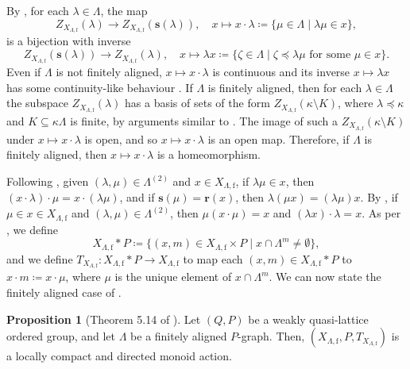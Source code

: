 \documentclass[11pt]{amsart}
\theoremstyle{definition}
\numberwithin{thm}{section}
\numberwithin{equation}{section}
\newtheorem{proposition}[thm]{Proposition}
\newcommand{\setof}[2]{\{ #1 \mid #2 \}}
\newcommand{\range}{\mathbf{r}}
\newcommand{\source}{\mathbf{s}}
\newcommand{\PSfiltershiftoff}[2]{#2 \cdot #1}
\newcommand{\PSfiltershifton}[2]{#1 #2}
\newcommand{\F}{\mathrm{f}}
\newcommand{\PS}[2]{X_{#2, #1}}
\newcommand{\RPA}[2]{#1 \cdot #2}
\newcommand{\composablepairs}[1]{#1^{(2)}}
\newcommand{\Fell}[3]{Z_{#1}\left(#2 \setminus #3\right)}
\newcommand{\Fellin}[2]{Z_{#1}\left(#2\right)}
\begin{document}
By \cite[Lemma 3.4]{BSV13}, for each $\lambda \in \Lambda$, the map
\[
\Fellin{\PS{\F}{\Lambda}}{\lambda} 
\to \Fellin{\PS{\F}{\Lambda}}{\source(\lambda)},
\quad 
x 
\mapsto \PSfiltershiftoff{\lambda}{x} 
\coloneqq \setof{\mu \in \Lambda}{\lambda\mu \in x},
\]
is a bijection with inverse 
\[
\Fellin{\PS{\F}{\Lambda}}{\source(\lambda)} 
\to \Fellin{\PS{\F}{\Lambda}}{\lambda},
\quad 
x 
\mapsto \PSfiltershifton{\lambda}{x} 
\coloneqq \setof{
\zeta \in \Lambda
}{
\zeta \preceq \lambda\mu \text{ for some } \mu \in x
}.
\]
Even if $\Lambda$ is not finitely aligned, $x \mapsto 
\PSfiltershiftoff{\lambda}{x}$ is continuous \cite[Lemma 5.3]{Jon26} 
and its inverse $x \mapsto \PSfiltershifton{\lambda}{x}$ has some 
continuity-like behaviour \cite[Lemma 5.13]{Jon26}.
If $\Lambda$ is finitely aligned, then for each $\lambda \in \Lambda$ the 
subspace $\Fellin{\PS{\F}{\Lambda}}{\lambda}$ has a basis of sets of the form 
$\Fell{\PS{\F}{\Lambda}}{\kappa}{K}$, where $\lambda \preceq \kappa$ and $K 
\subseteq \kappa\Lambda$ is finite, by arguments similar to 
\cite[Lemma 6.2]{Jon26}. 
The image of such a $\Fell{\PS{\F}{\Lambda}}{\kappa}{K}$ under $x \mapsto 
\PSfiltershiftoff{\lambda}{x}$ is open, and so $x \mapsto 
\PSfiltershiftoff{\lambda}{x}$ is an open map.
Therefore, if $\Lambda$ is finitely aligned, then $x \mapsto 
\PSfiltershiftoff{\lambda}{x}$ is a homeomorphism.

Following \cite[Lemma 5.1]{Jon26}, given $(\lambda, \mu) \in 
\composablepairs{\Lambda}$ and $x \in \PS{\F}{\Lambda}$, if $\lambda\mu \in 
x$, then $\PSfiltershiftoff{\mu}{(\PSfiltershiftoff{\lambda}{x})} = 
\PSfiltershiftoff{(\lambda\mu)}{x}$, and if $\source(\mu) = \range(x)$, then 
$\PSfiltershifton{\lambda}{(\PSfiltershifton{\mu}{x})} = 
\PSfiltershifton{(\lambda\mu)}{x}$.
By \cite[Lemma 3.4]{BSV13}, if $\mu \in x \in \PS{\F}{\Lambda}$ and 
$(\lambda, \mu) \in \composablepairs{\Lambda}$, then 
$\PSfiltershifton{\mu}{(\PSfiltershiftoff{\mu}{x})} = x$ and 
$\PSfiltershiftoff{\lambda}{(\PSfiltershifton{\lambda}{x})} = x$.
As per \cite[Definition 5.8]{Jon26}, we define
\[
\PS{\F}{\Lambda} * P \coloneqq 
\setof{
(x, m) \in \PS{\F}{\Lambda} \times P
}{
x \cap \Lambda^m \neq \emptyset
},
\]
and we define $T_{\PS{\F}{\Lambda}} \colon \PS{\F}{\Lambda} * P \to \PS{\F}{\Lambda}$ to map each $(x, m) \in \PS{\F}{\Lambda} * P$ to $\RPA{x}{m} \coloneqq \PSfiltershiftoff{\mu}{x}$, where $\mu$ is the unique element of $x \cap \Lambda^m$.
We can now state the finitely aligned case of \cite[Theorem 5.14]{Jon26}.

\begin{proposition}[Theorem 5.14 of \cite{Jon26}]
Let $(Q, P)$ be a weakly quasi-lattice ordered group, and let $\Lambda$ be a finitely aligned $P$-graph.
Then, $(\PS{\F}{\Lambda}, P, T_{\PS{\F}{\Lambda}})$ is a locally compact and directed monoid action.
\end{proposition}
\end{document}
